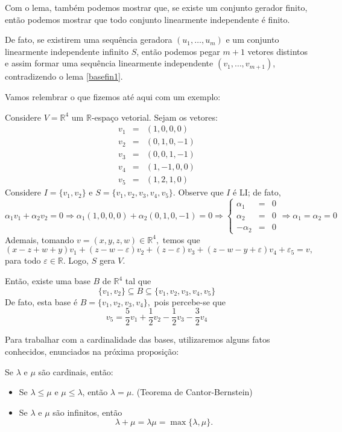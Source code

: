 \documentclass[11pt,twoside,a4paper]{book}
\begin{document}
\begin{observacao}\label{basefin2}
Com o lema, também podemos mostrar que, se existe um conjunto gerador finito, então podemos mostrar que todo conjunto linearmente independente é finito.

\medskip
\noindent
De fato, se existirem uma sequência geradora $(u_1,\dots,u_m)$ e um conjunto linearmente independente infinito $S$, então podemos pegar $m+1$ vetores distintos e assim formar uma sequência linearmente independente $(v_1,\dots,v_{m+1})$, contradizendo o lema \ref{basefin1}.
\end{observacao}

\noindent
Vamos relembrar o que fizemos até aqui com um exemplo:
\begin{exemplo}
Considere $V = \mathbb{R}^4$ um $\mathbb{R}$-espaço vetorial. Sejam os vetores:
\[
\begin{array}{rcl}
v_1 &=& (1,0,0,0) \\
v_2 &=& (0,1,0,-1) \\
v_3 &=& (0,0,1,-1) \\
v_4 &=& (1,-1,0,0) \\
v_5 &=& (1,2,1,0) 
\end{array}
\]
Considere $I = \{ v_1, v_2 \}$ e $S  =\{ v_1,v_2,v_3,v_4,v_5 \}.$ Observe que $I$ é LI; de fato,
\[
\alpha_1v_1 + \alpha_2v_2 = 0 \Rightarrow \alpha_1(1,0,0,0) + \alpha_2 (0,1,0,-1) = 0 \Rightarrow \left\{ \begin{array}{rcl} \alpha_1 &=& 0 \\ \alpha_2 &=& 0 \\ - \alpha_2 &=& 0 \end{array} \right. \Rightarrow \alpha_1 = \alpha_2 = 0
\]
Ademais, tomando $v = (x,y,z,w) \in \mathbb{R}^4,$ temos que
\[
(x-z+w+y)v_1 + (z- w - \varepsilon)v_2 + (z - \varepsilon)v_3 + (z-w-y + \varepsilon)v_4 + \varepsilon_5 = v,
\]
para todo $\varepsilon \in \mathbb{R}.$ Logo, $S$ gera $V.$ 

\medskip
\noindent
Então, existe uma base $B$ de $\mathbb{R}^4$ tal que 
\[
\{ v_1, v_2 \} \subseteq B \subseteq \{v_1,v_2,v_3,v_4,v_5 \}
\]
De fato, esta base é $B=\{v_1, v_2, v_3, v_4 \},$ pois percebe-se que
\[
v_5 = \frac{5}{2}v_1 + \frac{1}{2} v_2 - \frac{1}{2}v_3 - \frac{3}{2} v_4
\]
\end{exemplo}

\noindent
Para trabalhar com a cardinalidade das bases, utilizaremos alguns fatos
conhecidos, enunciados na próxima proposição:
\begin{proposicao}
Se $\lambda$ e $\mu$ são cardinais, então:
\begin{itemize}
\item Se $\lambda\leq\mu$ e $\mu\leq\lambda$, então $\lambda=\mu$. (Teorema de Cantor-Bernstein)
\item Se $\lambda$ e $\mu$ são infinitos, então \[\lambda+\mu=\lambda\mu=\max\{\lambda,\mu\}.\]
\end{itemize}
\end{proposicao}
\end{document}
